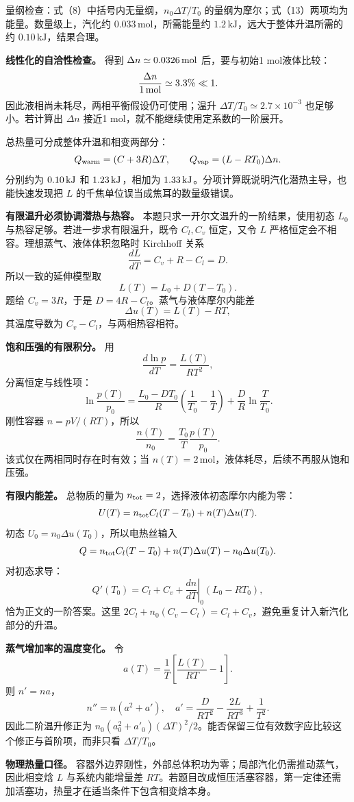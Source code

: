 \documentclass[12pt,a4paper,UTF8]{ctexart}
\begin{document}
量纲检查：式（8）中括号内无量纲，\(n_0\Delta T/T_0\)
的量纲为摩尔；式（13）两项均为能量。数量级上，汽化约
\(0.033\,\mathrm{mol}\)，所需能量约
\(1.2\,\mathrm{kJ}\)，远大于整体升温所需的约
\(0.10\,\mathrm{kJ}\)，结果合理。

\textbf{线性化的自洽性检查。} 得到 \(\Delta n\simeq0.0326\,{\rm mol}\)
后，要与初始1 mol液体比较： \[
\frac{\Delta n}{1\,{\rm mol}}\simeq3.3\%\ll1.
\] 因此液相尚未耗尽，两相平衡假设仍可使用；温升
\(\Delta T/T_0\simeq2.7\times10^{-3}\) 也足够小。若计算出 \(\Delta n\)
接近1 mol，就不能继续使用定系数的一阶展开。

总热量可分成整体升温和相变两部分： \[
Q_{\rm warm}=(C+3R)\Delta T,
\qquad
Q_{\rm vap}=(L-RT_0)\Delta n.
\] 分别约为 \(0.10\,{\rm kJ}\) 和 \(1.23\,{\rm kJ}\)，相加为
\(1.33\,{\rm kJ}\)。分项计算既说明汽化潜热主导，也能快速发现把 \(L\)
的千焦单位误当成焦耳的数量级错误。

\textbf{有限温升必须协调潜热与热容。}
本题只求一开尔文温升的一阶结果，使用初态 \(L_0\)
与热容足够。若进一步求有限温升，既令 \(C_l,C_v\) 恒定，又令 \(L\)
严格恒定会不相容。理想蒸气、液体体积忽略时 Kirchhoff 关系 \[
\frac{dL}{dT}=C_v+R-C_l=D.
\] 所以一致的延伸模型取 \[
L(T)=L_0+D(T-T_0).
\] 题给 \(C_v=3R\)，于是 \(D=4R-C_l\)。蒸气与液体摩尔内能差 \[
\Delta u(T)=L(T)-RT,
\] 其温度导数为 \(C_v-C_l\)，与两相热容相符。

\textbf{饱和压强的有限积分。} 用 \[
\frac{d\ln p}{dT}=\frac{L(T)}{RT^2},
\] 分离恒定与线性项： \[
\ln\frac{p(T)}{p_0}=
\frac{L_0-DT_0}{R}\left(\frac1{T_0}-\frac1T\right)
+\frac D R\ln\frac T{T_0}.
\] 刚性容器 \(n=pV/(RT)\)，所以 \[
\frac{n(T)}{n_0}=\frac{T_0}{T}\frac{p(T)}{p_0}.
\] 该式仅在两相同时存在时有效；当
\(n(T)=2\,\mathrm{mol}\)，液体耗尽，后续不再服从饱和压强。

\textbf{有限内能差。} 总物质的量为
\(n_{\rm tot}=2\)，选择液体初态摩尔内能为零： \[
U(T)=n_{\rm tot}C_l(T-T_0)+n(T)\Delta u(T).
\] 初态 \(U_0=n_0\Delta u(T_0)\)，所以电热丝输入 \[
Q=n_{\rm tot}C_l(T-T_0)
+n(T)\Delta u(T)-n_0\Delta u(T_0).
\] 对初态求导： \[
Q'(T_0)=C_l+C_v+
\left.\frac{dn}{dT}\right|_0(L_0-RT_0),
\] 恰为正文的一阶答案。这里
\(2C_l+n_0(C_v-C_l)=C_l+C_v\)，避免重复计入新汽化部分的升温。

\textbf{蒸气增加率的温度变化。} 令 \[
a(T)=\frac1T\left[\frac{L(T)}{RT}-1\right].
\] 则 \(n'=na\)， \[
n''=n(a^2+a'),\quad
a'=\frac{D}{RT^2}-\frac{2L}{RT^3}+\frac1{T^2}.
\] 因此二阶温升修正为
\(n_0(a_0^2+a'_0)(\Delta T)^2/2\)。能否保留三位有效数字应比较这个修正与首阶项，而非只看
\(\Delta T/T_0\)。

\textbf{物理热量口径。}
容器外边界刚性，外部总体积功为零；局部汽化仍需推动蒸气，因此相变焓 \(L\)
与系统内能增量差
\(RT\)。若题目改成恒压活塞容器，第一定律还需加活塞功，热量才在适当条件下包含相变焓本身。
\end{document}
